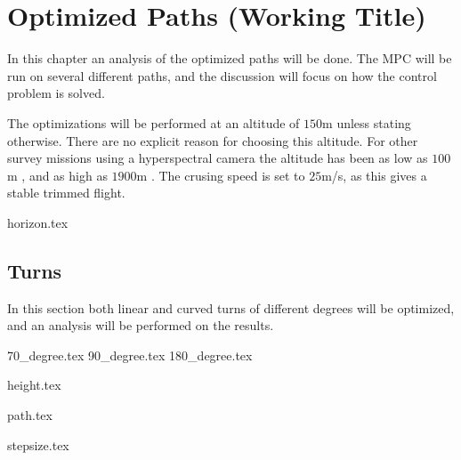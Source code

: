 \chapter{Optimized Paths (Working Title)}


In this chapter an analysis of the optimized paths will be done. The MPC will be run on several different paths, and the discussion will focus on how the control problem is solved.

The optimizations will be performed at an altitude of $150$m unless stating otherwise. There are no explicit reason for choosing this altitude. For other survey missions using a hyperspectral camera the altitude has been as low as $100$m \cite{hymsySUOMALAINEN}, and as high as $1900$m \cite{mosaicASMAT}. The crusing speed is set to $25$m/s, as this gives a stable trimmed flight.


{horizon.tex}

\section{Turns}

In this section both linear and curved turns of different degrees will be optimized, and an analysis will be performed on the results.

{70_degree.tex}
{90_degree.tex}
{180_degree.tex}	

{height.tex}

{path.tex}

{stepsize.tex}